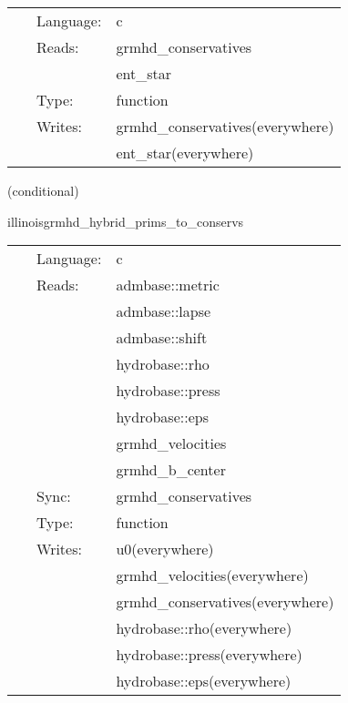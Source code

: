 \hspace{5mm}

 \begin{tabular*}{160mm}{cll} 
~ & Language:  & c \\ 
~ & Reads:  & grmhd\_conservatives \\ 
~& ~ &ent\_star\\ 
~ & Type:  & function \\ 
~ & Writes:  & grmhd\_conservatives(everywhere) \\ 
~& ~ &ent\_star(everywhere)\\ 
\end{tabular*} 


\vspace{5mm}

   (conditional) 

\hspace{5mm} illinoisgrmhd\_hybrid\_prims\_to\_conservs 

\hspace{5mm}{\it hybrid version of illinoisgrmhd\_prims\_to\_conservs } 


\hspace{5mm}

 \begin{tabular*}{160mm}{cll} 
~ & Language:  & c \\ 
~ & Reads:  & admbase::metric \\ 
~& ~ &admbase::lapse\\ 
~& ~ &admbase::shift\\ 
~& ~ &hydrobase::rho\\ 
~& ~ &hydrobase::press\\ 
~& ~ &hydrobase::eps\\ 
~& ~ &grmhd\_velocities\\ 
~& ~ &grmhd\_b\_center\\ 
~ & Sync:  & grmhd\_conservatives \\ 
~ & Type:  & function \\ 
~ & Writes:  & u0(everywhere) \\ 
~& ~ &grmhd\_velocities(everywhere)\\ 
~& ~ &grmhd\_conservatives(everywhere)\\ 
~& ~ &hydrobase::rho(everywhere)\\ 
~& ~ &hydrobase::press(everywhere)\\ 
~& ~ &hydrobase::eps(everywhere)\\ 
\end{tabular*} 


